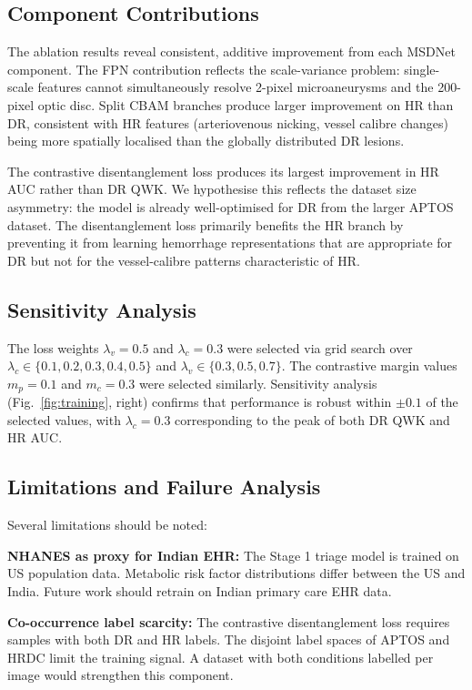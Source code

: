 \documentclass[conference]{IEEEtran}
\begin{document}
\subsection{Component Contributions}

The ablation results reveal consistent, additive improvement from each MSDNet component. The FPN contribution reflects the scale-variance problem: single-scale features cannot simultaneously resolve 2-pixel microaneurysms and the 200-pixel optic disc. Split CBAM branches produce larger improvement on HR than DR, consistent with HR features (arteriovenous nicking, vessel calibre changes) being more spatially localised than the globally distributed DR lesions.

The contrastive disentanglement loss produces its largest improvement in HR AUC rather than DR QWK. We hypothesise this reflects the dataset size asymmetry: the model is already well-optimised for DR from the larger APTOS dataset. The disentanglement loss primarily benefits the HR branch by preventing it from learning hemorrhage representations that are appropriate for DR but not for the vessel-calibre patterns characteristic of HR.

\subsection{Sensitivity Analysis}

The loss weights $\lambda_v{=}0.5$ and $\lambda_c{=}0.3$ were selected via grid search over $\lambda_c \in \{0.1, 0.2, 0.3, 0.4, 0.5\}$ and $\lambda_v \in \{0.3, 0.5, 0.7\}$. The contrastive margin values $m_p{=}0.1$ and $m_c{=}0.3$ were selected similarly. Sensitivity analysis (Fig.~\ref{fig:training}, right) confirms that performance is robust within $\pm 0.1$ of the selected values, with $\lambda_c{=}0.3$ corresponding to the peak of both DR QWK and HR AUC.

\subsection{Limitations and Failure Analysis}

Several limitations should be noted:

\textbf{NHANES as proxy for Indian EHR:} The Stage 1 triage model is trained on US population data. Metabolic risk factor distributions differ between the US and India. Future work should retrain on Indian primary care EHR data.

\textbf{Co-occurrence label scarcity:} The contrastive disentanglement loss requires samples with both DR and HR labels. The disjoint label spaces of APTOS and HRDC limit the training signal. A dataset with both conditions labelled per image would strengthen this component.
\end{document}
